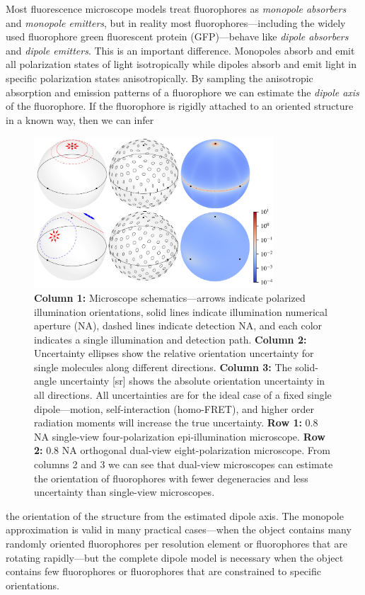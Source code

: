 \documentclass[11pt]{article}
\begin{document}
{Most fluorescence microscope models treat fluorophores as \textit{monopole
  absorbers} and \textit{monopole emitters}, but in reality most
fluorophores---including the widely used fluorophore green fluorescent protein
(GFP)---behave like \textit{dipole absorbers} and \textit{dipole emitters}. This
is an important difference. Monopoles absorb and emit all polarization states of
light isotropically while dipoles absorb and emit light in specific polarization
states anisotropically. By sampling the anisotropic absorption and emission
patterns of a fluorophore we can estimate the \textit{dipole axis} of the
fluorophore. If the fluorophore is rigidly attached to an oriented structure in a
known way, then we can infer \parfillskip=0pt\par}
\begin{figure}[H]
\centering
  \includegraphics[width=0.8\textwidth, interpolate=true, trim={0em 0em 0em 0em}]{figs/proposal-fig}
  \caption{\textbf{Column 1:} Microscope schematics---arrows indicate polarized
    illumination orientations, solid lines indicate illumination numerical
    aperture (NA), dashed lines indicate detection NA, and each color indicates
    a single illumination and detection path. \textbf{Column 2:} Uncertainty
    ellipses show the relative orientation uncertainty for single molecules
    along different directions. \textbf{Column 3:} The solid-angle uncertainty
    [sr] shows the absolute orientation uncertainty in all directions. All
    uncertainties are for the ideal case of a fixed single dipole---motion,
    self-interaction (homo-FRET), and higher order radiation moments will
    increase the true uncertainty. \textbf{Row 1:} 0.8 NA single-view
    four-polarization epi-illumination microscope. \textbf{Row 2:} 0.8 NA
    orthogonal dual-view eight-polarization microscope. From columns 2 and 3 we
    can see that dual-view microscopes can estimate the orientation of
    fluorophores with fewer degeneracies and less uncertainty than single-view
    microscopes.}
  \label{fig:comparison}
\end{figure}
\noindent the orientation of the structure from the estimated dipole axis. The
monopole approximation is valid in many practical cases---when the object
contains many randomly oriented fluorophores per resolution element or
fluorophores that are rotating rapidly---but the complete dipole model is
necessary when the object contains few fluorophores or fluorophores that are
constrained to specific orientations.
\end{document}
